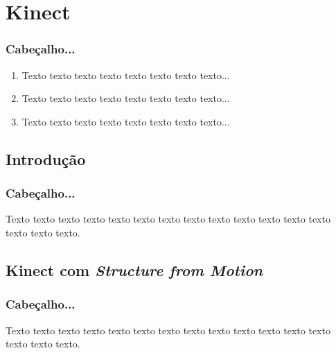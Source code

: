 \documentclass[table, usenames, svgnames, dvipsnames]{beamer}
\begin{document}
\section{Kinect}

\begin{frame}
\frametitle{Cabeçalho...}
	\begin{enumerate}
    	\item Texto texto texto texto texto texto texto texto...
		\\[0.5em]

    	\item Texto texto texto texto texto texto texto texto...
		\\[0.5em]
    	
		\item Texto texto texto texto texto texto texto texto...
		\\[0.5em]
	\end{enumerate}
\end{frame}

\subsection{Introdução}

\begin{frame} 
\frametitle{\textbf{Cabeçalho...}}
	\begin{center}
		Texto texto texto texto texto texto texto texto texto texto texto texto texto
		texto texto texto.
	\end{center}
\end{frame}

\subsection{Kinect com \emph{Structure from Motion}}

\begin{frame} 
\frametitle{\textbf{Cabeçalho...}}
	\begin{center}
		Texto texto texto texto texto texto texto texto texto texto texto texto texto
		texto texto texto.
	\end{center}
\end{frame}
\end{document}
